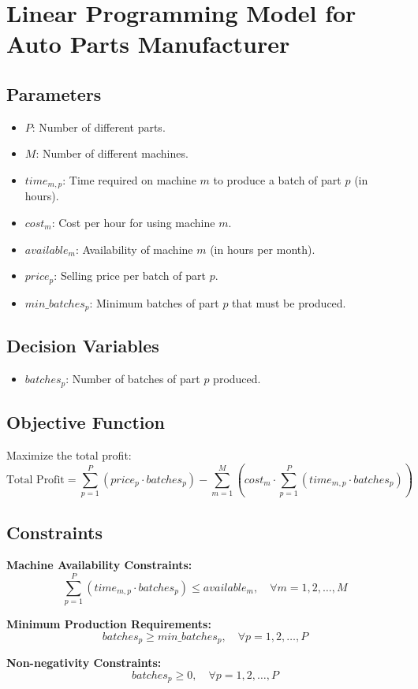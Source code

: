 \documentclass{article}
\begin{document}
\section*{Linear Programming Model for Auto Parts Manufacturer}

\subsection*{Parameters}
\begin{itemize}
    \item $P$: Number of different parts.
    \item $M$: Number of different machines.
    \item $time_{m,p}$: Time required on machine $m$ to produce a batch of part $p$ (in hours).
    \item $cost_{m}$: Cost per hour for using machine $m$.
    \item $available_{m}$: Availability of machine $m$ (in hours per month).
    \item $price_{p}$: Selling price per batch of part $p$.
    \item $min\_batches_{p}$: Minimum batches of part $p$ that must be produced.
\end{itemize}

\subsection*{Decision Variables}
\begin{itemize}
    \item $batches_{p}$: Number of batches of part $p$ produced.
\end{itemize}

\subsection*{Objective Function}
Maximize the total profit:
\[
\text{Total Profit} = \sum_{p=1}^{P} (price_{p} \cdot batches_{p}) - \sum_{m=1}^{M} (cost_{m} \cdot \sum_{p=1}^{P} (time_{m,p} \cdot batches_{p}))
\]

\subsection*{Constraints}

\textbf{Machine Availability Constraints:}
\[
\sum_{p=1}^{P} (time_{m,p} \cdot batches_{p}) \leq available_{m}, \quad \forall m = 1, 2, \ldots, M
\]

\textbf{Minimum Production Requirements:}
\[
batches_{p} \geq min\_batches_{p}, \quad \forall p = 1, 2, \ldots, P
\]

\textbf{Non-negativity Constraints:}
\[
batches_{p} \geq 0, \quad \forall p = 1, 2, \ldots, P
\]
\end{document}
